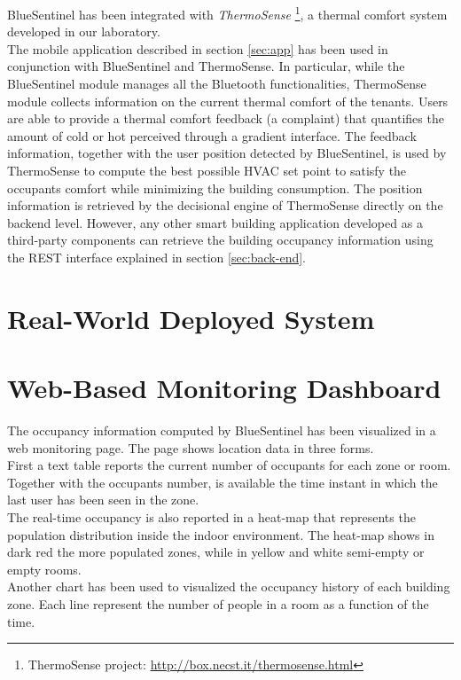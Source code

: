 BlueSentinel has been integrated with \emph{ThermoSense}
\footnote{ThermoSense project: \url{http://box.necst.it/thermosense.html}}, a thermal comfort system developed in our laboratory.\\
The mobile application described in section \ref{sec:app} has been used in conjunction with BlueSentinel and ThermoSense. In particular, while the BlueSentinel module manages all the Bluetooth functionalities, ThermoSense module collects information on the current thermal comfort of the tenants. Users are able to provide a thermal comfort feedback (a complaint) that quantifies the amount of cold or hot perceived through a gradient interface. The feedback information, together with the user position detected by BlueSentinel, is used by ThermoSense to compute the best possible HVAC set point to satisfy the occupants comfort while minimizing the building consumption.
The position information is retrieved by the decisional engine of ThermoSense directly on the backend level. However, any other smart building application developed as a third-party components can retrieve the building occupancy information using the REST interface explained in section \ref{sec:back-end}.


\section{Real-World Deployed System}
\label{sec:lab}

\section{Web-Based Monitoring Dashboard}
\label{sec:webmonitor}
The occupancy information computed by BlueSentinel has been visualized in a web monitoring page. The page shows location data in three forms.\\
First a text table reports the current number of occupants for each zone or room. Together with the occupants number, is available the time instant in which the last user has been seen in the zone.\\
The real-time occupancy is also reported in a heat-map that represents the population distribution inside the indoor environment. The heat-map shows in dark red the more populated zones, while in yellow and white semi-empty or empty rooms.\\
Another chart has been used to visualized the occupancy history of each building zone. Each line represent the number of people in a room as a function of the time.

